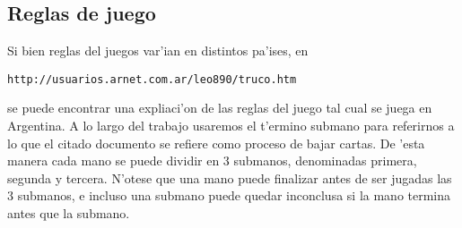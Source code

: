\subsection{Reglas de juego}
Si bien reglas del juegos var'ian en distintos pa'ises, en 
\begin{verbatim}
http://usuarios.arnet.com.ar/leo890/truco.htm
\end{verbatim}
se puede encontrar una expliaci'on de las reglas del juego tal cual se juega en Argentina. A lo largo del trabajo usaremos el t'ermino submano para referirnos a lo que el citado documento se refiere como proceso de bajar cartas. De 'esta manera cada mano se puede dividir en 3 submanos, denominadas primera, segunda y tercera. N'otese que una mano puede finalizar antes de ser jugadas las 3 submanos, e incluso una submano puede quedar inconclusa si la mano termina antes que la submano.
